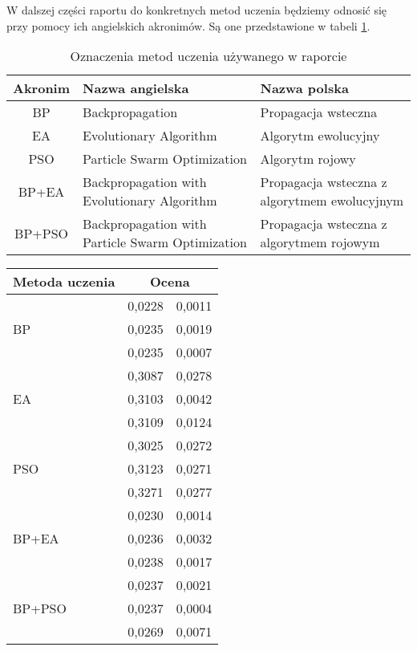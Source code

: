 \documentclass[11pt,a4paper,oneside]{report}
\begin{document}
W dalszej części raportu do konkretnych metod uczenia będziemy odnosić się przy pomocy ich angielskich akronimów. Są one przedstawione w tabeli \ref{table:acronyms}.

\begin{table}[H]
	\caption{Oznaczenia metod uczenia używanego w raporcie \label{table:acronyms}}
	\begin{tabularx}{\linewidth}{|c|X|X|}
		\hline
		Akronim & Nazwa angielska & Nazwa polska \\
		\hline \hline
		BP & Backpropagation & Propagacja wsteczna \\ \hline
		EA & Evolutionary Algorithm & Algorytm ewolucyjny \\ \hline
		PSO & Particle Swarm Optimization & Algorytm rojowy \\ \hline
		BP+EA & Backpropagation with Evolutionary Algorithm & Propagacja wsteczna z algorytmem ewolucyjnym \\ \hline
		BP+PSO & Backpropagation with Particle Swarm Optimization & Propagacja wsteczna z algorytmem rojowym \\ \hline
	\end{tabularx}
\end{table}


\begin{table}[H]
	\caption{Porównanie efektywności różnych metod uczenia \label{table:compare}. Dla każdej metody przedstawiono 3 najlepsze wyniki uzyskane podczas przeprowadzania badań.}
	\centering 
	\begin{longtable}{|l|r@{$\pm$}r|}
		\hline
		Metoda uczenia & \multicolumn{2}{|c|}{Ocena} \\
		\hline \hline
		\multirow{3}{*}{BP} & 0,0228 & 0,0011 \\ 
		 & 0,0235 & 0,0019 \\ 
		 & 0,0235 & 0,0007 \\ \hline
		\multirow{3}{*}{EA} & 0,3087 & 0,0278 \\ 
		 & 0,3103 & 0,0042 \\ 
		 & 0,3109 & 0,0124 \\ \hline
		\multirow{3}{*}{PSO} & 0,3025 & 0,0272 \\ 
		 & 0,3123 & 0,0271 \\ 
		 & 0,3271 & 0,0277 \\ \hline
		\multirow{3}{*}{BP+EA} & 0,0230 & 0,0014 \\
		 & 0,0236 & 0,0032 \\
		 & 0,0238 & 0,0017 \\ \hline
		\multirow{3}{*}{BP+PSO} & 0,0237 & 0,0021 \\
		 & 0,0237 & 0,0004 \\
		 & 0,0269 & 0,0071 \\ \hline
	\end{longtable}
\end{table}
\end{document}
